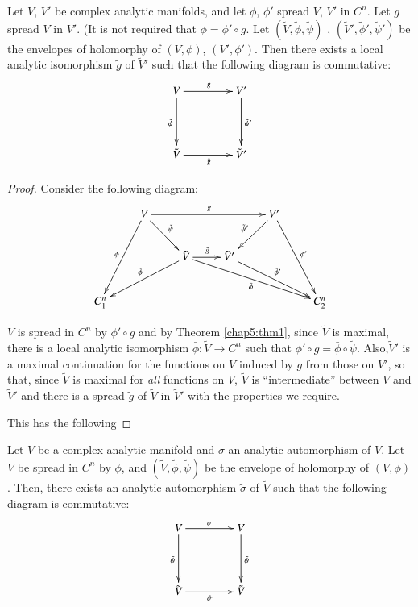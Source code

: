 \begin{thm}\label{chap5:thm2}
Let $V$, $V'$ be complex analytic manifolds, and let $\phi$, $\phi'$
spread $V$, $V'$ in $C^n$. Let $g$ spread $V$ in $V'$. (It is not
required that $\phi = \phi' \circ g$. Let $(\tilde{V}, \tilde{\phi},
\tilde{\psi})$ , $(\tilde{V}', \tilde{\phi}', \tilde{\psi}')$ be the
envelopes of holomorphy of $(V, \phi)$, $(V', \phi')$. Then there
exists a local analytic isomorphism $\tilde{g}$ of $\tilde{V}'$ such
that the following diagram is commutative:
\[
\xymatrix@C=1.5cm@R=1.5cm{
V \ar[r]^g \ar[d]_{\tilde{\psi}} & V' \ar[d]^{\tilde{\psi}'}\\
\tilde{V} \ar[r]_{\tilde{g}}  &  \tilde{V}'
}
\]
\end{thm}

\begin{proof}
Consider the following diagram:
\[
\xymatrix{
& V \ar[rrr]^g \ar[dr]^{\tilde{\psi}} \ar[ddl]_{\phi} & & & 
  V'\ar[ddr]^{\phi'}\ar[dl]_{\tilde{\psi}'}  & \\
& & \tilde{V} \ar[r]^{\tilde{g}} \ar[dll]_{\tilde{\phi}}
  \ar[drrr]_{\bar{\phi}} & \tilde{V}' \ar[drr]^{\tilde{\phi}'} & &  
  \\
C^n_1 &  & & & & C^n_2
}
\]

$V$ is spread in $C^n$ by $\phi' \circ g$ and by Theorem \ref{chap5:thm1}, since
$\tilde{V}$ is maximal, there is a local analytic isomorphism
$\bar{\phi} : \tilde{V} \to C^n$ such that $\phi' \circ g = \bar{\phi}
\circ \tilde{\psi}$. Also,\pageoriginale $\tilde{V}'$ is a maximal
continuation for the functions on $V$ induced by $g$ from those on
$V'$, so that, since $\tilde{V}$ is maximal for \textit{all} functions on $V$,
$\tilde{V}$ is ``intermediate'' between $V$ and $\tilde{V}'$ and there
is a spread $\tilde{g}$ of $\tilde{V}$ in $\tilde{V}'$ with the
properties we require.

This has the following
\end{proof}

\begin{coro*}
Let $V$ be a complex analytic manifold and $\sigma$ an analytic
automorphism of $V$. Let $V$ be spread in $C^n$ by $\phi$, and
$(\tilde{V}, \tilde{\phi}, \tilde{\psi})$ be the envelope of
holomorphy of $(V, \phi)$. Then, there exists an analytic automorphism
$\tilde{\sigma}$ of $\tilde{V}$ such that the following diagram is
commutative: 
\[
\xymatrix@R=1.5cm@C=1.5cm{
V \ar[r]^\sigma \ar[d]_{\tilde{\psi}} & V \ar[d]^{\tilde{\psi}}\\
\tilde{V} \ar[r]_{\tilde{\sigma}} & \tilde{V}
}
\]
\end{coro*}

